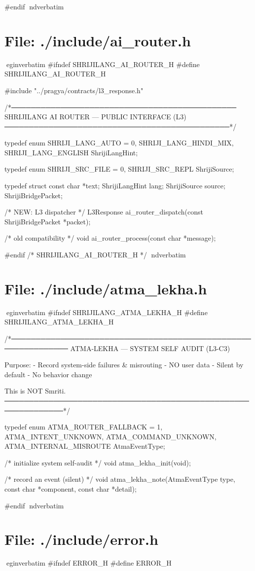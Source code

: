 \documentclass{article}
\begin{document}
#endif
nd{verbatim}
\section*{File: ./include/ai_router.h}
egin{verbatim}
#ifndef SHRIJILANG_AI_ROUTER_H
#define SHRIJILANG_AI_ROUTER_H

#include "../pragya/contracts/l3_response.h"

/*──────────────────────────────────────────────
  SHRIJILANG AI ROUTER — PUBLIC INTERFACE (L3)
──────────────────────────────────────────────*/

typedef enum {
    SHRIJI_LANG_AUTO = 0,
    SHRIJI_LANG_HINDI_MIX,
    SHRIJI_LANG_ENGLISH
} ShrijiLangHint;

typedef enum {
    SHRIJI_SRC_FILE = 0,
    SHRIJI_SRC_REPL
} ShrijiSource;

typedef struct {
    const char      *text;
    ShrijiLangHint   lang;
    ShrijiSource     source;
} ShrijiBridgePacket;

/* NEW: L3 dispatcher */
L3Response ai_router_dispatch(const ShrijiBridgePacket *packet);

/* old compatibility */
void ai_router_process(const char *message);

#endif /* SHRIJILANG_AI_ROUTER_H */
nd{verbatim}
\section*{File: ./include/atma_lekha.h}
egin{verbatim}
#ifndef SHRIJILANG_ATMA_LEKHA_H
#define SHRIJILANG_ATMA_LEKHA_H

/*──────────────────────────────────────────────────────────────
  ATMA-LEKHA — SYSTEM SELF AUDIT (L3-C3)

  Purpose:
  - Record system-side failures & misrouting
  - NO user data
  - Silent by default
  - No behavior change

  This is NOT Smriti.
──────────────────────────────────────────────────────────────*/

typedef enum {
    ATMA_ROUTER_FALLBACK = 1,
    ATMA_INTENT_UNKNOWN,
    ATMA_COMMAND_UNKNOWN,
    ATMA_INTERNAL_MISROUTE
} AtmaEventType;

/* initialize system self-audit */
void atma_lekha_init(void);

/* record an event (silent) */
void atma_lekha_note(AtmaEventType type,
                     const char *component,
                     const char *detail);

#endif
nd{verbatim}
\section*{File: ./include/error.h}
egin{verbatim}
#ifndef ERROR_H
#define ERROR_H
\end{document}
